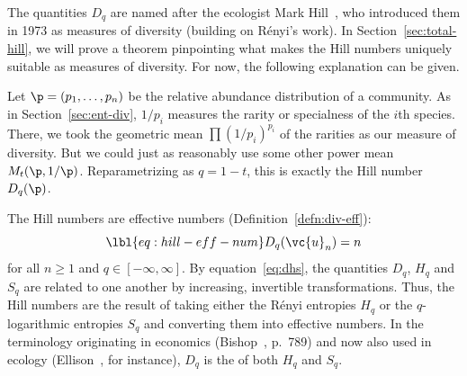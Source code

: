 The quantities $D_q$ are named after the ecologist Mark%
%
%
Hill~\cite{Hill}, who introduced them in 1973 as measures of diversity
(building on R\'enyi's work).  In Section~\ref{sec:total-hill}, we will
prove a theorem pinpointing what makes the Hill numbers uniquely suitable
as measures of diversity.  For now, the following explanation can be given.

Let $\p = (p_1, \ldots, p_n)$ be the relative abundance distribution of a
community.  As in Section~\ref{sec:ent-div}, $1/p_i$ measures the
rarity or specialness of the $i$th
species.  There, we took the geometric mean $\prod (1/p_i)^{p_i}$ of the
rarities as our measure of diversity.  But we could just as reasonably use
some other power mean $M_t(\p, 1/\p)$.  Reparametrizing as $q = 1 - t$,
this is exactly the Hill number $D_q(\p)$.

The Hill numbers are effective%
%
%
numbers (Definition~\ref{defn:div-eff}):
% 
\begin{equation}
\lbl{eq:hill-eff-num}
D_q(\vc{u}_n) = n
\end{equation}
% 
for all $n \geq 1$ and $q \in [-\infty, \infty]$.  By
equation~\eqref{eq:dhs}, the quantities $D_q$, $H_q$ and $S_q$ are related
to one another by increasing, invertible transformations.  Thus, the Hill
numbers are the result of taking either the R\'enyi entropies $H_q$ or the
$q$-logarithmic entropies $S_q$ and converting them into effective numbers.
In the terminology originating in economics
(Bishop~\cite{Bish}, p.~789) and now also used in ecology
(Ellison~\cite{ElliPD}, for instance), $D_q$ is the  of both $H_q$ and $S_q$.  

